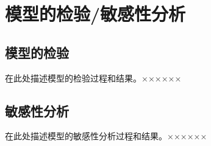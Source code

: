 \section{模型的检验/敏感性分析}
\subsection{模型的检验}
在此处描述模型的检验过程和结果。××××××

\subsection{敏感性分析}
在此处描述模型的敏感性分析过程和结果。××××××